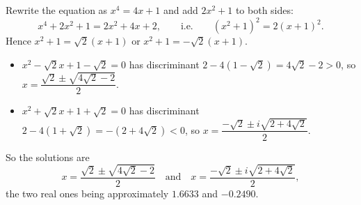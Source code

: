 Rewrite the equation as $x^4=4x+1$ and add $2x^2+1$ to both sides:
\[x^4+2x^2+1=2x^2+4x+2,\qquad\text{i.e.}\qquad\left(x^2+1\right)^2=2(x+1)^2.\]
Hence $x^2+1=\sqrt2(x+1)$ or $x^2+1=-\sqrt2(x+1)$.
\begin{itemize}
\item $x^2-\sqrt2x+1-\sqrt2=0$ has discriminant $2-4\left(1-\sqrt2\right)=4\sqrt2-2>0$, so $x=\dfrac{\sqrt2\pm\sqrt{4\sqrt2-2}}{2}$.
\item $x^2+\sqrt2x+1+\sqrt2=0$ has discriminant $2-4\left(1+\sqrt2\right)=-\left(2+4\sqrt2\right)<0$, so $x=\dfrac{-\sqrt2\pm i\sqrt{2+4\sqrt2}}{2}$.
\end{itemize}
So the solutions are
\[\boxed{x=\dfrac{\sqrt2\pm\sqrt{4\sqrt2-2}}{2}\quad\text{and}\quad x=\dfrac{-\sqrt2\pm i\sqrt{2+4\sqrt2}}{2}},\]
the two real ones being approximately $1.6633$ and $-0.2490$.
